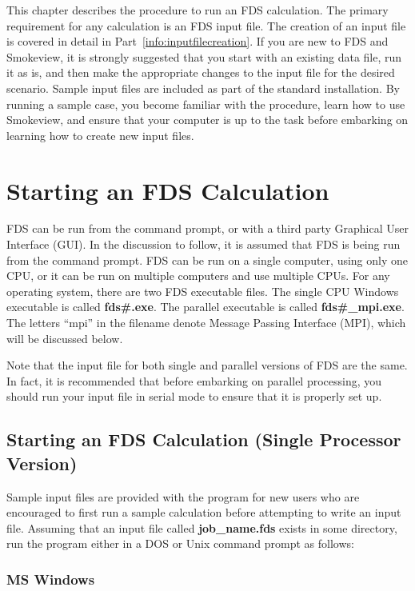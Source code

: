\documentclass[11pt]{book}
\begin{document}
This chapter describes the procedure to run an FDS calculation.
The primary requirement for any calculation is an FDS input file. The creation of an
input file is covered in detail in Part~\ref{info:inputfilecreation}.
If you are new to FDS and Smokeview, it is strongly suggested that you start with an existing data file, run it as is,
and then make the appropriate changes to the input file for the
desired scenario. Sample input files are included as part of the standard installation.
By running a sample case, you become familiar with the procedure, learn how to use Smokeview, and
ensure that your computer is up to the task before embarking on
learning how to create new input files.

\section{Starting an FDS Calculation}
FDS can be run from the command prompt, or with a third party Graphical User Interface (GUI).
In the discussion to follow, it is assumed that FDS is being run from the command prompt.
FDS can be run on a single computer, using only one CPU, or it can be run on multiple
computers and use multiple CPUs. For any operating system, there are two FDS executable files.
The single CPU Windows executable is called {\bf fds\#.exe}.
The parallel executable is called {\bf fds\#\_mpi.exe}. The letters ``mpi'' in the filename denote
Message Passing Interface (MPI), which will be discussed below.

\begin{warning}
\noindent
Note that the input file for both single and parallel versions of FDS are the same.
In fact, it is recommended that before embarking on parallel processing, you should run your input
file in serial mode to ensure that it is properly set up.
\end{warning}


\subsection{Starting an FDS Calculation (Single Processor Version)}
Sample input files are provided with the program for new users who
are encouraged to first run a sample calculation before attempting to
write an input file. Assuming that an input file called {\bf job\_name.fds}
exists in some directory, run the program either in a DOS or Unix command prompt as follows:


\subsubsection{MS Windows}
\end{document}
